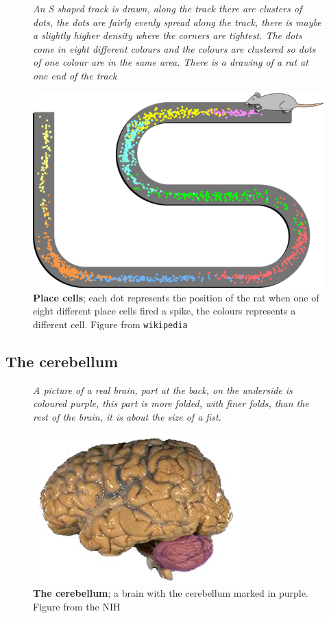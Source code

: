 \documentclass[12pt]{article}
\begin{document}
\begin{figure}[tbhp]
{\textsl{An S shaped track is drawn, along the track there are clusters of dots, the dots are fairly evenly spread along the track, there is maybe a slightly higher density where the corners are tightest. The dots come in eight different colours and the colours are clustered so dots of one colour are in the same area. There is a drawing of a rat at one end of the track}}
{
  \begin{center}
  \includegraphics[width=12cm]{place.png}
  \end{center}
  }
    \caption{\textbf{Place cells}; each dot represents the position of
    the rat when one of eight different place cells fired a spike, the
    colours represents a different cell. Figure from
    \texttt{wikipedia}\label{fig_place}}
\end{figure}


\subsection*{The cerebellum}


\begin{figure}[tbhp]
{\textsl{A picture of a real brain, part at the back, on the underside is coloured purple, this part is more folded, with finer folds, than the rest of the brain, it is about the size of a fist.}}
{
  \begin{center}
  \includegraphics[width=8cm]{cerebellum.png}
  \end{center}
  }
  \caption{\textbf{The cerebellum}; a brain with the cerebellum marked in purple. Figure from
    the NIH\label{fig_cerebellum}}
\end{figure}
\end{document}
